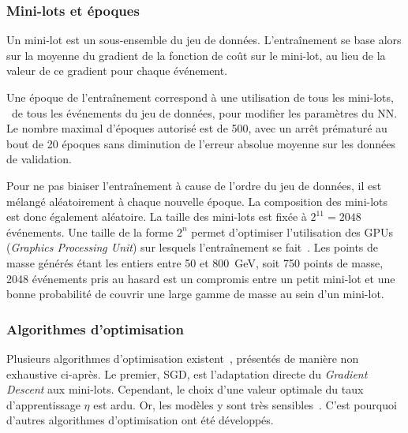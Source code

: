 \subsubsection{Mini-lots et époques}\label{chapter-ML-section-DNN-training-minibatch}
Un mini-lot est un sous-ensemble du jeu de données.
L'entraînement se base alors sur la moyenne du gradient de la fonction de coût sur le mini-lot, au lieu de la valeur de ce gradient pour chaque événement.
\par
Une \og époque \fg{} de l'entraînement correspond à une utilisation de tous les mini-lots, \ie\ de tous les événements du jeu de données, pour modifier les paramètres du NN.
Le nombre maximal d'époques autorisé est de \num{500}, avec un arrêt prématuré au bout de \num{20} époques sans diminution de l'erreur absolue moyenne sur les données de validation.
\par
Pour ne pas biaiser l'entraînement à cause de l'ordre du jeu de données,
il est mélangé aléatoirement à chaque nouvelle époque.
La composition des mini-lots est donc également aléatoire.
La taille des mini-lots est fixée à $2^{11}=\num{2048}$ événements.
Une taille de la forme $2^n$ permet d'optimiser l'utilisation des GPUs (\emph{Graphics Processing Unit}) sur lesquels l'entraînement se fait~\cite{DNN}.
Les points de masse générés étant les entiers entre \num{50} et \SI{800}{\GeV}, soit \num{750} points de masse,
\num{2048} événements pris au hasard est un compromis entre
un petit mini-lot
et
une bonne probabilité de couvrir une large gamme de masse au sein d'un mini-lot.
\subsubsection{Algorithmes d'optimisation}\label{chapter-ML-section-DNN-training-optimizers}
Plusieurs algorithmes d'optimisation existent~\cite{DNN}, présentés de manière non exhaustive ci-après.
Le premier, SGD, est l'adaptation directe du \emph{Gradient Descent} aux mini-lots.
Cependant, le choix d'une valeur optimale du taux d'apprentissage $\eta$ est ardu.
Or, les modèles y sont très sensibles~\cite{DNN}.
C'est pourquoi d'autres algorithmes d'optimisation ont été développés.
